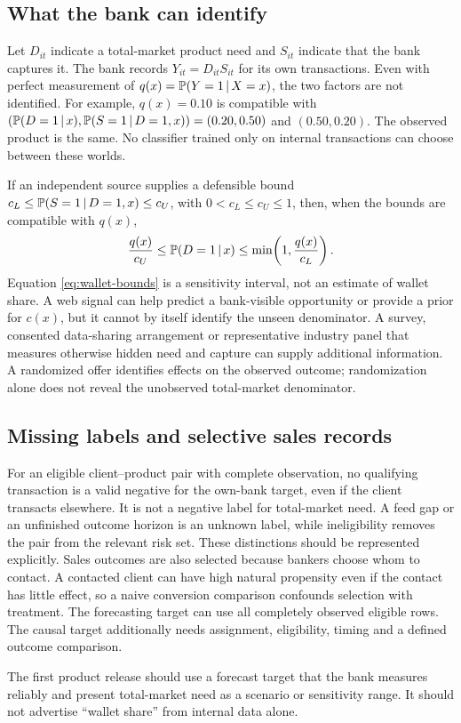 \subsection{What the bank can identify}

Let $D_{it}$ indicate a total-market product need and $S_{it}$ indicate that the bank captures it. The bank records $Y_{it}=D_{it}S_{it}$ for its own transactions. Even with perfect measurement of $q(x)=\mathbb{P}(Y=1\,|\, X=x)$, the two factors are not identified. For example, $q(x)=0.10$ is compatible with $(\mathbb{P}(D=1\,|\, x),\mathbb{P}(S=1\,|\, D=1,x))=(0.20,0.50)$ and $(0.50,0.20)$. The observed product is the same. No classifier trained only on internal transactions can choose between these worlds.

If an independent source supplies a defensible bound $c_L\le\mathbb{P}(S=1\,|\, D=1,x)\le c_U$, with $0<c_L\le c_U\le1$, then, when the bounds are compatible with $q(x)$,
\begin{equation}
 \frac{q(x)}{c_U}\le \mathbb{P}(D=1\,|\, x)\le \min\!\left(1,\frac{q(x)}{c_L}\right).
 \label{eq:wallet-bounds}
\end{equation}
 Equation \eqref{eq:wallet-bounds} is a sensitivity interval, not an estimate of wallet share. A web signal can help predict a bank-visible opportunity or provide a prior for $c(x)$, but it cannot by itself identify the unseen denominator. A survey, consented data-sharing arrangement or representative industry panel that measures otherwise hidden need and capture can supply additional information. A randomized offer identifies effects on the observed outcome; randomization alone does not reveal the unobserved total-market denominator.

\subsection{Missing labels and selective sales records}

For an eligible client--product pair with complete observation, no qualifying transaction is a valid negative for the own-bank target, even if the client transacts elsewhere. It is not a negative label for total-market need. A feed gap or an unfinished outcome horizon is an unknown label, while ineligibility removes the pair from the relevant risk set. These distinctions should be represented explicitly. Sales outcomes are also selected because bankers choose whom to contact. A contacted client can have high natural propensity even if the contact has little effect, so a naive conversion comparison confounds selection with treatment. The forecasting target can use all completely observed eligible rows. The causal target additionally needs assignment, eligibility, timing and a defined outcome comparison.

The first product release should use a forecast target that the bank measures reliably and present total-market need as a scenario or sensitivity range. It should not advertise ``wallet share'' from internal data alone.

